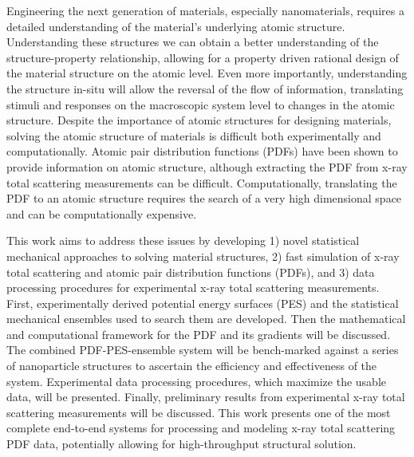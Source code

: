 Engineering the next generation of materials, especially nanomaterials, requires a detailed understanding of the material's underlying atomic structure.
 Understanding these structures we can obtain a better understanding of the structure-property relationship, allowing for a property driven rational design of the material structure on the atomic level.
 Even more importantly, understanding the structure in-situ will allow the reversal of the flow of information, translating stimuli and responses on the macroscopic system level to changes in the atomic structure.
 Despite the importance of atomic structures for designing materials, solving the atomic structure of materials is difficult both experimentally and computationally.
 Atomic pair distribution functions (PDFs) have been shown to provide information on atomic structure, although extracting the PDF from x-ray total scattering measurements can be difficult.
 Computationally, translating the PDF to an atomic structure requires the search of a very high dimensional space and can be computationally expensive.

This work aims to address these issues by developing 1) novel statistical mechanical approaches to solving material structures, 2)  fast simulation of x-ray total scattering and atomic pair distribution functions (PDFs), and 3) data processing procedures for experimental x-ray total scattering measurements.
First, experimentally derived potential energy surfaces (PES) and the statistical mechanical ensembles used to search them are developed.
Then the mathematical and computational framework for the PDF and its gradients will be discussed.
The combined PDF-PES-ensemble system will be bench-marked against a series of nanoparticle structures to ascertain the efficiency and effectiveness of the system.
Experimental data processing procedures, which maximize the usable data, will be presented.
Finally, preliminary results from experimental x-ray total scattering measurements will be discussed.
This work presents one of the most complete end-to-end systems for processing and modeling x-ray total scattering PDF data, potentially allowing for high-throughput structural solution.
